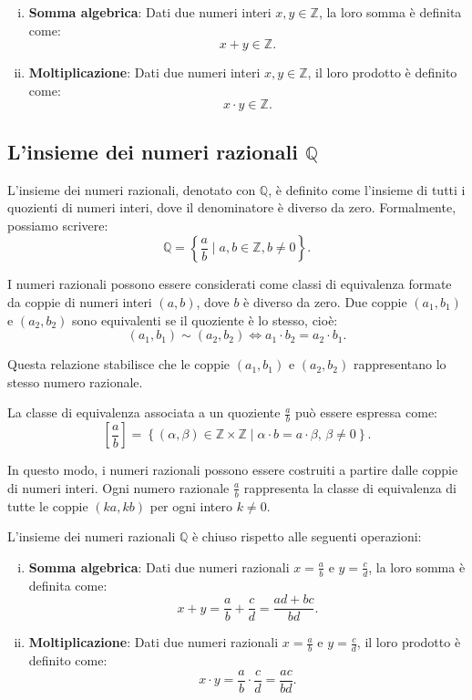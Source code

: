\documentclass[a4paper,12pt]{article}
\begin{document}
\begin{enumerate}[i.]
	\item \textbf{Somma algebrica}: Dati due numeri interi \( x, y \in \mathbb{Z} \), la loro somma è definita come:
	      \[
		      x + y \in \mathbb{Z}.
	      \]

	\item \textbf{Moltiplicazione}: Dati due numeri interi \( x, y \in \mathbb{Z} \), il loro prodotto è definito come:
	      \[
		      x \cdot y \in \mathbb{Z}.
	      \]
\end{enumerate}

\subsection{L'insieme dei numeri razionali \(\mathbb{Q}\)}
L'insieme dei numeri razionali, denotato con \(\mathbb{Q}\), è definito come l'insieme di tutti i quozienti di numeri interi, dove il denominatore è diverso da zero. Formalmente, possiamo scrivere:
\[
	\mathbb{Q} = \left\{ \frac{a}{b} \mid a, b \in \mathbb{Z}, b \neq 0 \right\}.
\]

I numeri razionali possono essere considerati come classi di equivalenza formate da coppie di numeri interi \((a, b)\), dove \(b\) è diverso da zero. Due coppie \((a_1, b_1)\) e \((a_2, b_2)\) sono equivalenti se il quoziente è lo stesso, cioè:
\[
	(a_1, b_1) \sim (a_2, b_2) \iff a_1 \cdot b_2 = a_2 \cdot b_1.
\]

Questa relazione stabilisce che le coppie \((a_1, b_1)\) e \((a_2, b_2)\) rappresentano lo stesso numero razionale.

La classe di equivalenza associata a un quoziente \(\frac{a}{b}\) può essere espressa come:
\[
	\left[\frac{a}{b}\right] = \left\{ \left(\alpha, \beta\right) \in \mathbb{Z} \times \mathbb{Z} \mid \alpha \cdot b = a \cdot \beta, \, \beta \neq 0 \right\}.
\]

In questo modo, i numeri razionali possono essere costruiti a partire dalle coppie di numeri interi. Ogni numero razionale \(\frac{a}{b}\) rappresenta la classe di equivalenza di tutte le coppie \((ka, kb)\) per ogni intero \(k \neq 0\).

L'insieme dei numeri razionali \(\mathbb{Q}\) è chiuso rispetto alle seguenti operazioni:

\begin{enumerate}[i.]
	\item \textbf{Somma algebrica}: Dati due numeri razionali \( x = \frac{a}{b} \) e \( y = \frac{c}{d} \), la loro somma è definita come:
	      \[
		      x + y = \frac{a}{b} + \frac{c}{d} = \frac{ad + bc}{bd}.
	      \]

	\item \textbf{Moltiplicazione}: Dati due numeri razionali \( x = \frac{a}{b} \) e \( y = \frac{c}{d} \), il loro prodotto è definito come:
	      \[
		      x \cdot y = \frac{a}{b} \cdot \frac{c}{d} = \frac{ac}{bd}.
	      \]
\end{enumerate}
\end{document}
